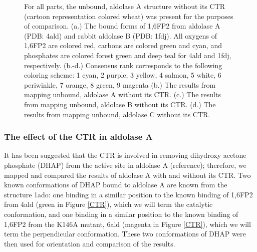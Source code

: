 \documentclass[11pt,a4paper]{article}
\begin{document}
\begin{figure}
\begin{center}
{		}
		\caption{For all parts, the unbound, aldolase A structure without its CTR (cartoon representation colored wheat)
			was present for the purposes of comparison.  (a.) The bound forms of 1,6FP2 from aldolase A (PDB: 4ald) and rabbit aldolase B (PDB: 1fdj).  
			All oxygens of 1,6FP2 are
			colored red, carbons are colored green and cyan, and phosphates are colored forest green and deep teal for 4ald and 1fdj, respectively.
			(b.-d.)
			Consensus rank corresponds to the following coloring scheme:
			1 cyan, 2 purple, 3 yellow, 4 salmon, 5 white, 6 periwinkle, 7 orange, 8 green, 9 magenta
			(b.)  The results from mapping unbound, aldolase A without its CTR.  (c.)  The results from mapping unbound, aldolase B without its CTR.  
			(d.)  The results from mapping unbound, aldolase C without its CTR. 
		}
		\label{CTRless}
	\end{center}
\end{figure}
	

\subsubsection{The effect of the CTR in aldolase A}
	It has been suggested that the CTR is involved in removing dihydroxy acetone phosphate (DHAP) from the active 
	site in aldolase A (reference); therefore, we mapped and compared
	the results of aldolase A with and without its CTR. Two known conformations of DHAP bound to aldolase A are known from the structure 1ado: one binding in a similar
	position to the known binding of 1,6FP2 from 4ald (green in Figure \ref{CTR}), which we will term the catalytic conformation, and one binding in a similar position to the 
	known binding of 1,6FP2 from the K146A mutant, 6ald (magenta in Figure \ref{CTR}), which we will term the perpendicular conformation.  
	These two conformations of DHAP were then used for orientation and comparison of the results.
\end{document}
